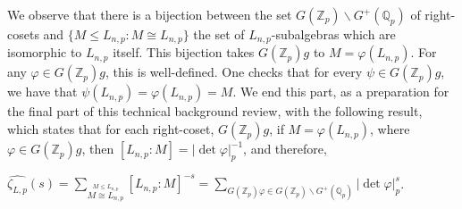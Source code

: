 \documentclass[12pt]{article}
\begin{document}
We observe that there is a bijection between the set $G(\mathbb{Z}_p)\backslash G^+(\mathbb{Q}_p)$ of right-cosets and $\{M\leq L_{n,p} : M\cong L_{n,p}\}$ the set of $L_{n,p}$-subalgebras which are isomorphic to $L_{n,p}$ itself. This bijection takes $G(\mathbb{Z}_p)g$ to $M=\varphi(L_{n,p})$. For any $\varphi\in G(\mathbb{Z}_p)g$, this is well-defined. One checks that for every $\psi\in G(\mathbb{Z}_p)g$, we have that $\psi(L_{n,p})=\varphi(L_{n,p})=M$.
We end this part, as a preparation for the final part of this technical background review, with the following result, which states that for each right-coset, $G(\mathbb{Z}_p)g$, if $M=\varphi(L_{n,p})$, where $\varphi\in G(\mathbb{Z}_p)g$, then $[L_{n,p}:M]=|\det\varphi|_p^{-1}$, and therefore,\par $\hat{\zeta_{L,p}}(s)=\underset{\overset{\scriptscriptstyle M\leq L_{n,p}}{\scriptscriptstyle M\cong L_{n,p}}}{\sum}[L_{n,p}:M]^{-s}=\underset{\scriptscriptstyle G(\mathbb{Z}_p)\varphi\in G(\mathbb{Z}_p)\backslash G^+(\mathbb{Q}_p)}{\sum}|\det\varphi|_p^s$.
\end{document}
